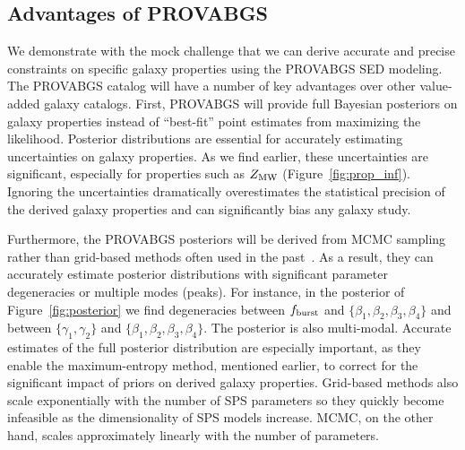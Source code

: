 \subsection{Advantages of PROVABGS}
We demonstrate with the mock challenge that we can derive accurate and precise
constraints on specific galaxy properties using the {\sc PROVABGS} SED modeling.
The {\sc PROVABGS} catalog will have a number of key advantages over other
value-added galaxy catalogs. 
First, {\sc PROVABGS} will provide full Bayesian posteriors on galaxy
properties instead of ``best-fit'' point estimates from maximizing the
likelihood. 
Posterior distributions are essential for accurately estimating uncertainties
on galaxy properties.  
As we find earlier, these uncertainties are significant, especially for
properties such as $Z_{\rm MW}$ (Figure~\ref{fig:prop_inf}). 
Ignoring the uncertainties dramatically overestimates the statistical precision
of the derived galaxy properties and can significantly bias any galaxy study.

Furthermore, the {\sc PROVABGS} posteriors will be derived from MCMC sampling
rather than grid-based methods often used in the
past~\citep[\emph{e.g.}][]{dacunha2008, moustakas2013, boquien2019}.
As a result, they can accurately estimate posterior distributions with
significant parameter degeneracies or multiple modes (peaks). 
For instance, in the posterior of Figure~\ref{fig:posterior} we find
degeneracies between $f_{\rm burst}$ and $\{\beta_1, \beta_2, \beta_3,
\beta_4\}$ and between $\{\gamma_1, \gamma_2\}$ and $\{\beta_1, \beta_2,
\beta_3, \beta_4\}$. 
The posterior is also multi-modal. 
Accurate estimates of the full posterior distribution are especially important,
as they enable the maximum-entropy method, mentioned earlier, 
to correct for the significant impact of priors on derived galaxy properties.
Grid-based methods also scale exponentially with the number of SPS parameters
so they quickly become infeasible as the dimensionality of SPS models increase. 
MCMC, on the other hand, scales approximately linearly with the number of
parameters. 

